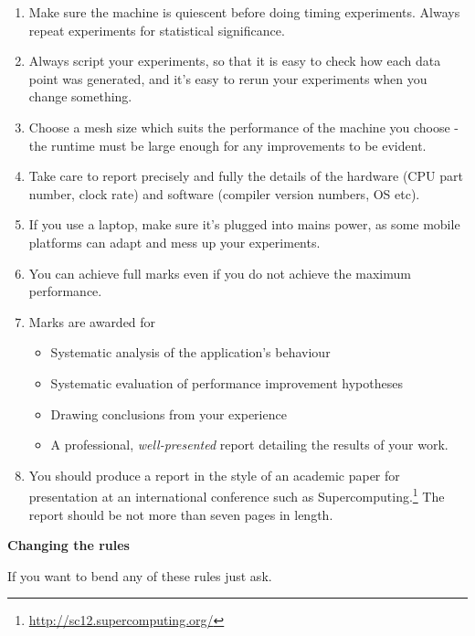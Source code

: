 \documentclass{article}
\begin{document}
\begin{enumerate}
\item Make sure the machine is quiescent before doing timing experiments. Always repeat experiments for statistical significance.
\item Always script your experiments, so that it is easy to check how each data point was generated, and it's easy to rerun your experiments when you change something.
\item Choose a mesh size which suits the performance of the machine you choose - the runtime must be large enough for any improvements to be evident. 
\item Take care to report precisely and fully the details of the hardware (CPU part number, clock rate) and software (compiler version numbers, OS etc).  
\item If you use a laptop, make sure it's plugged into mains power, as some mobile platforms can adapt and mess up your experiments.
\item You can achieve full marks even if you do not achieve the maximum performance.
\item Marks are awarded for
\begin{itemize}
  \item Systematic analysis of the application's behaviour
  \item Systematic evaluation of performance improvement hypotheses
  \item Drawing conclusions from your experience
  \item A professional, {\em well-presented} report detailing the results of your work.
\end{itemize}
\item You should produce a report in the style of an academic paper for presentation at an international conference such as Supercomputing.\footnote{\url{http://sc12.supercomputing.org/}} The report should be not more than seven pages in length.
\end{enumerate}

\textbf{Changing the rules}

If you want to bend any of these rules just ask.
\end{document}
